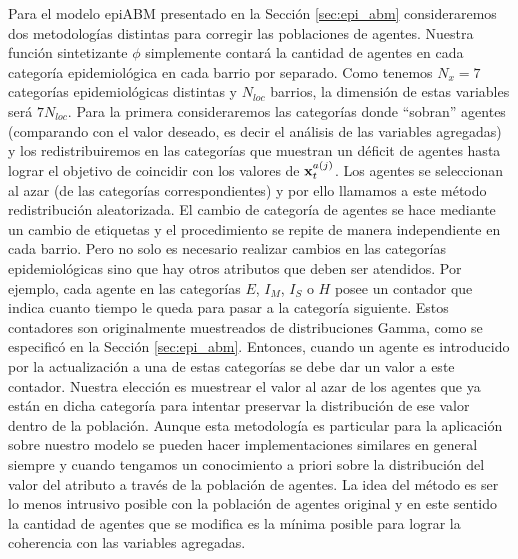 Para el modelo epiABM presentado en la Sección \ref{sec:epi_abm} consideraremos dos metodologías distintas para corregir las poblaciones de agentes. Nuestra función sintetizante $\phi$ simplemente contará la cantidad de agentes en cada categoría epidemiológica en cada barrio por separado. Como tenemos $N_x = 7$ categorías epidemiológicas distintas y $N_{loc}$ barrios, la dimensión de estas variables será $7 N_{loc}$. Para la primera consideraremos las categorías donde ``sobran'' agentes (comparando con el valor deseado, es decir el análisis de las variables agregadas) y los redistribuiremos en las categorías que muestran un déficit de agentes hasta lograr el objetivo de coincidir con los valores de $\mathbf{x}_t^{a(j)}$. Los agentes se seleccionan al azar (de las categorías correspondientes) y por ello llamamos a este método redistribución aleatorizada. El cambio de categoría de agentes se hace mediante un cambio de etiquetas y el procedimiento se repite de manera independiente en cada barrio. Pero no solo es necesario realizar cambios en las categorías epidemiológicas sino que hay otros atributos que deben ser atendidos. Por ejemplo, cada agente en las categorías $E$, $I_M$, $I_S$ o $H$ posee un contador que indica cuanto tiempo le queda para pasar a la categoría siguiente. Estos contadores son originalmente muestreados de distribuciones Gamma, como se especificó en la Sección \ref{sec:epi_abm}. Entonces, cuando un agente es introducido por la actualización a una de estas categorías se debe dar un valor a este contador. Nuestra elección es muestrear el valor al azar de los agentes que ya están en dicha categoría para intentar preservar la distribución de ese valor dentro de la población. Aunque esta metodología es particular para la aplicación sobre nuestro modelo se pueden hacer implementaciones similares en general siempre y cuando tengamos un conocimiento a priori sobre la distribución del valor del atributo a través de la población de agentes. La idea del método es ser lo menos intrusivo posible con la población de agentes original y en este sentido la cantidad de agentes que se modifica es la mínima posible para lograr la coherencia con las variables agregadas.

